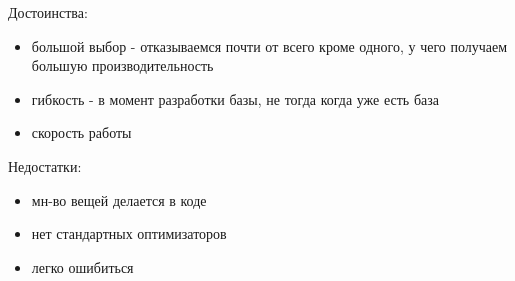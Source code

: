 Достоинства:
\begin{itemize}
    \item большой выбор - отказываемся почти от всего кроме одного, у чего получаем
большую производительность
    \item гибкость - в момент разработки базы, не тогда когда уже есть база
    \item скорость работы
\end{itemize}

Недостатки:
\begin{itemize}
    \item мн-во вещей делается в коде
    \item нет стандартных оптимизаторов
    \item легко ошибиться
\end{itemize}
